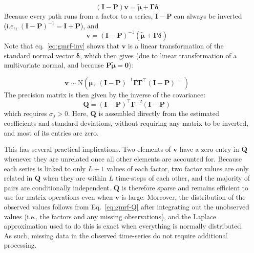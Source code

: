 \documentclass[12pt]{article}
\begin{document}
\begin{equation}
  \left(\mathbf{I} - \mathbf{P}\right)\mathbf{v} =
  \tilde{\boldsymbol\mu} + \boldsymbol\Gamma \boldsymbol\delta
  \label{eq:gmrf-solve}
\end{equation}
Because every path runs from a factor to a series,
$\mathbf{I} - \mathbf{P}$ can always be inverted (i.e.,
$(\mathbf{I} - \mathbf{P})^{-1} = \mathbf{I} + \mathbf{P}$), and
\begin{equation}
  \mathbf{v} = \left(\mathbf{I} - \mathbf{P}\right)^{-1}
  \left(\tilde{\boldsymbol\mu} + \boldsymbol\Gamma \boldsymbol\delta\right)
  \label{eq:gmrf-inv}
\end{equation}
Note that eq.~\ref{eq:gmrf-inv} shows that $\mathbf{v}$ is a linear
transformation of the standard normal vector $\boldsymbol\delta$, which
then gives (due to linear transformation of a multivariate normal, and
because $\mathbf{P}\tilde{\boldsymbol\mu} = \mathbf{0}$):

\begin{equation}
  \mathbf{v} \sim \mathrm{N}\!\left(\tilde{\boldsymbol\mu},\;
  \left(\mathbf{I} - \mathbf{P}\right)^{-1}
  \boldsymbol\Gamma \boldsymbol\Gamma^\top
  \left(\mathbf{I} - \mathbf{P}\right)^{-\top}\right)
  \label{eq:gmrf-cov}
\end{equation}
The precision matrix is then given by the inverse of the covariance:
\begin{equation}
  \mathbf{Q} = \left(\mathbf{I} - \mathbf{P}\right)^\top
               \boldsymbol\Gamma^{-2}
               \left(\mathbf{I} - \mathbf{P}\right)
  \label{eq:gmrf-Q}
\end{equation}
which requires $\sigma_j > 0$. Here, $\mathbf{Q}$ is assembled directly
from the estimated coefficients and standard deviations, without
requiring any matrix to be inverted, and most of its entries are zero.

This has several practical implications. Two elements of $\mathbf{v}$
have a zero entry in $\mathbf{Q}$ whenever they are unrelated once all
other elements are accounted for. Because each series is linked to
only $L+1$ values of each factor, two factor values are only related in
$\mathbf{Q}$ when they are within $L$ time-steps of each other, and the
majority of pairs are conditionally independent. $\mathbf{Q}$ is
therefore sparse and remains efficient to use for matrix operations
even when $\mathbf{v}$ is large. Moreover, the distribution of the
observed values follows from Eq.~\ref{eq:gmrf-Q} after integrating out
the unobserved values (i.e., the factors and any missing observations),
and the Laplace approximation used to do this is exact when everything
is normally distributed. As such, missing data in the observed
time-series do not require additional processing.
\end{document}
